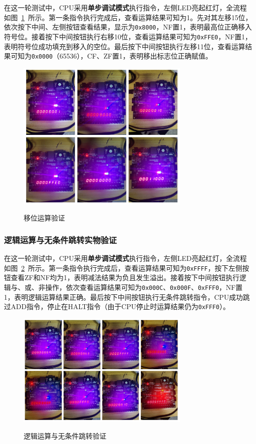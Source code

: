 \documentclass[lang=cn,a4paper,newtx]{elegantpaper}
\begin{document}
在这一轮测试中，CPU采用\textbf{单步调试模式}执行指令，左侧LED亮起红灯，全流程如图~\ref{fig:FPGA_shift}~所示。第一条指令执行完成后，查看运算结果可知为1。先对其左移15位，依次按下中间、左侧按钮查看结果，显示为\texttt{0x8000}，NF置1，表明最高位正确移入符号位。接着按下中间按钮执行右移10位，查看运算结果可知为\texttt{0xFFE0}，NF置1，表明符号位成功填充到移入的空位。最后按下中间按钮执行左移11位，查看运算结果可知为\texttt{0x0000}（65536），CF、ZF置1，表明移出标志位正确赋值。
\begin{figure}[htbp]
  \centering
  \caption{移位运算验证}
  \includegraphics[width = 0.75\textwidth]{figure/shift_verification.pdf}
  \label{fig:FPGA_shift}
\end{figure}

\subsubsection{逻辑运算与无条件跳转实物验证}

在这一轮测试中，CPU采用\textbf{单步调试模式}执行指令，左侧LED亮起红灯，全流程如图~\ref{fig:FPGA_logic}~所示。第一条指令执行完成后，查看运算结果可知为\texttt{0xFFFF}，按下左侧按钮查看ZF和NF均为1，表明减法结果为负且发生溢出。接着按下中间按钮执行逻辑与、或、非操作，依次查看运算结果可知为\texttt{0x000C}、\texttt{0x000F}、\texttt{0xFFF0}，NF置1，表明逻辑运算结果正确。最后按下中间按钮执行无条件跳转指令，CPU成功跳过ADD指令，停止在HALT指令（由于CPU停止时运算结果仍为\texttt{0xFFF0}）。
\begin{figure}[htbp]
  \centering
  \caption{逻辑运算与无条件跳转验证}
  \includegraphics[width = 0.75\textwidth]{figure/logic_verification.pdf}
  \label{fig:FPGA_logic}
\end{figure}
\end{document}
